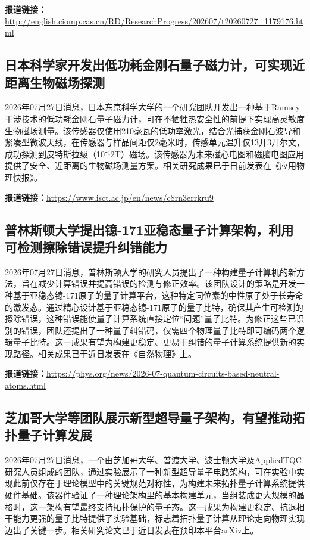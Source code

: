 \documentclass[12pt,a4paper]{ctexart}
\begin{document}
\noindent\textbf{报道链接：}\url{http://english.ciomp.cas.cn/RD/ResearchProgress/202607/t20260727\_1179176.html}

\subsection{ 日本科学家开发出低功耗金刚石量子磁力计，可实现近距离生物磁场探测 }

2026年07月27日消息，日本东京科学大学的一个研究团队开发出一种基于Ramsey干涉技术的低功耗金刚石量子磁力计，可在不牺牲热安全性的前提下实现高灵敏度生物磁场测量。该传感器仅使用210毫瓦的低功率激光，结合光捕获金刚石波导和紧凑型微波天线，在传感器与样品间距仅2毫米时，传感单元温升仅13开3开尔文，成功探测到皮特斯拉级（10⁻¹2T）磁场。该传感器为未来磁心电图和磁脑电图应用提供了安全、近距离的生物磁场测量方案。相关研究成果已于日前发表在《应用物理快报》。

\noindent\textbf{报道链接：}\url{https://www.isct.ac.jp/en/news/c8rn3errkru9}

\subsection{ 普林斯顿大学提出镱-171亚稳态量子计算架构，利用可检测擦除错误提升纠错能力 }

2026年07月27日消息，普林斯顿大学的研究人员提出了一种构建量子计算机的新方法，旨在减少计算错误并提高错误的检测与修正效率。该团队设计的策略是开发一种基于亚稳态镱-171原子的量子计算平台，这种特定同位素的中性原子处于长寿命的激发态。通过精心设计基于亚稳态镱-171原子的量子比特，确保其产生可检测的擦除错误，这种错误能使量子计算系统直接定位“问题”量子比特。为修正这些已识别的错误，团队还提出了一种量子纠错码，仅需四个物理量子比特即可编码两个逻辑量子比特。这一成果有望为构建更稳定、更易于纠错的量子计算系统提供新的实现路径。相关成果已于近日发表在《自然物理》上。

\noindent\textbf{报道链接：}\url{https://phys.org/news/2026-07-quantum-circuits-based-neutral-atoms.html}

\subsection{ 芝加哥大学等团队展示新型超导量子架构，有望推动拓扑量子计算发展 }

2026年07月27日消息，一个由芝加哥大学、普渡大学、波士顿大学及AppliedTQC研究人员组成的团队，通过实验展示了一种新型超导量子电路架构，可在实验中实现此前仅存在于理论模型中的关键规范对称性，为构建未来拓扑量子计算系统提供硬件基础。该器件验证了一种理论架构里的基本构建单元，当组装成更大规模的晶格时，这一架构有望最终支持拓扑保护的量子态。这一成果为构建更稳定、抗退相干能力更强的量子比特提供了实验基础，标志着拓扑量子计算从理论走向物理实现迈出了关键一步。相关研究论文已于近日发表在预印本平台arXiv上。
\end{document}
